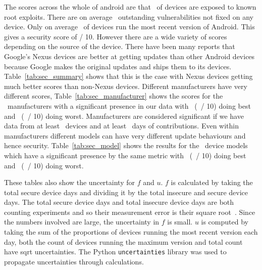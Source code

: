 The scores across the whole of android are that \daMeanInsecurityPerc\ of devices are exposed to known root exploits.
There are on average \daMeanOutstandingVulnerabilities\ outstanding vulnerabilities not fixed on any device.
Only on average \daUpdatednessPerc\ of devices run the most recent version of Android.
This gives a security score of \daSecurityScore / 10.
\daTabSecScoressummary
However there are a wide variety of scores depending on the source of the device.
There have been many reports that Google's Nexus devices are better at getting updates than other Android devices because Google makes the original updates and ships them to its devices.
Table~\ref{tab:sec_summary} shows that this is the case with Nexus devices getting much better scores than non-Nexus devices.
\daTabSecScoresmanufacturer
Different manufacturers have very different scores, Table~\ref{tab:sec_manufacturer} shows the scores for the \daNumSigManufacturers\ manufacturers with a significant presence in our data with \daSecScoreBestmanufacturer\ (\daSecScoreBestmanufacturerScore\ / 10) doing best and \daSecScoreWorstmanufacturer\ (\daSecScoreWorstmanufacturerScore\ / 10) doing worst.
Manufacturers are considered significant if we have data from at least \daSigNumDevices\ devices and at least \daSigNumDeviceDays\ days of contributions.
\daTabSecScoresmodel
Even within manufacturers different models can have very different update behaviours and hence security.
Table~\ref{tab:sec_model} shows the results for the \daNumSigModels\ device models which have a significant presence by the same metric with \daSecScoreBestmodel\ (\daSecScoreBestmodelScore\ / 10) doing best and \daSecScoreWorstmodel\ (\daSecScoreWorstmodelScore\ / 10) doing worst.


These tables also show the uncertainty for $f$ and $u$.
$f$ is calculated by taking the total secure device days and dividing it by the total insecure and secure device days.
The total secure device days and total insecure device days are both counting experiments and so their measurement error is their square root~\cite{Taylor1997}.
Since the numbers involved are large, the uncertainty in $f$ is small.
$u$ is computed by taking the sum of the proportions of devices running the most recent version each day, both the count of devices running the maximum version and total count have sqrt uncertainties.
The Python \texttt{uncertainties} library was used to propagate uncertainties through calculations.

